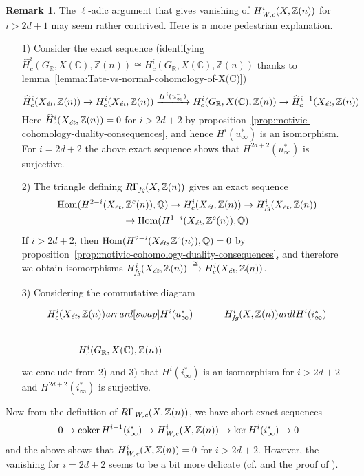\documentclass[draft,leqno,12pt]{article}
\theoremstyle{plain}
\theoremstyle{definition}
\newtheorem{remark}[theorem]{\indent\sc Remark}
\DeclareMathOperator{\Hom}{Hom}
\DeclareMathOperator{\coker}{coker}
\newcommand{\ZZ}{\mathbb{Z}}
\newcommand{\QQ}{\mathbb{Q}}
\newcommand{\RR}{\mathbb{R}}
\newcommand{\CC}{\mathbb{C}}
\newcommand{\Wc}{\text{\it W,c}}
\newcommand{\et}{\text{\it \'{e}t}}
\newcommand{\fg}{\text{\it fg}}
\newcommand{\ar}{\text{\it ar}}
\begin{document}
\begin{remark}
  The $\ell$-adic argument that gives vanishing of $H^i_\Wc (X, \ZZ(n))$ for
  $i > 2d+1$ may seem rather contrived. Here is a more pedestrian explanation.

  \begin{enumerate}
  \item[1)] Consider the exact sequence
    (identifying
    $\widehat{H}^i_c (G_\RR, X (\CC), \ZZ (n)) \cong H^i_c (G_\RR, X (\CC), \ZZ (n))$
    thanks to lemma~\ref{lemma:Tate-vs-normal-cohomology-of-X(C)})
    \[ \widehat{H}^i_c (X_\et, \ZZ(n)) \to H^i_c (X_\et, \ZZ(n))
      \xrightarrow{H^i (u_\infty^*)} H^i_c (G_\RR, X (\CC), \ZZ (n)) \to
      \widehat{H}^{i+1}_c (X_\et, \ZZ(n)) \]
    Here $\widehat{H}^i_c (X_\et, \ZZ(n)) = 0$ for $i > 2d+2$
    by proposition~\ref{prop:motivic-cohomology-duality-consequences},
    and hence $H^i (u_\infty^*)$ is an isomorphism.
    For $i = 2d+2$ the above exact sequence shows that $H^{2d+2} (u_\infty^*)$
    is surjective.

  \item[2)] The triangle defining $R\Gamma_\fg (X, \ZZ(n))$ gives an exact sequence
    \begin{multline*}
      \Hom (H^{2-i} (X_\et, \ZZ^c (n)), \QQ) \to
      H^i_c (X_\et, \ZZ(n)) \to
      H^i_\fg (X_\et, \ZZ(n)) \\
      \to \Hom (H^{1-i} (X_\et, \ZZ^c (n)), \QQ)
    \end{multline*}
    If $i > 2d + 2$, then $\Hom (H^{2-i} (X_\et, \ZZ^c (n)), \QQ) = 0$ by
    proposition~\ref{prop:motivic-cohomology-duality-consequences}, and
    therefore we obtain isomorphisms
    $H^i_\fg (X_\et, \ZZ(n)) \xrightarrow{\cong} H^i_c (X_\et, \ZZ(n))$.

  \item[3)] Considering the commutative diagram
    \[ \begin{tikzcd}
        H^i_c (X_\et, \ZZ(n)) \ar{r}\ar{d}[swap]{H^i (u_\infty^*)} & H^i_\fg (X, \ZZ(n))\ar{dl}{H^i (i_\infty^*)} \\
        H^i_c (G_\RR, X (\CC), \ZZ (n))
      \end{tikzcd} \]
    we conclude from 2) and 3) that $H^i (i_\infty^*)$ is an isomorphism for
    $i > 2d+2$ and $H^{2d+2} (i_\infty^*)$ is surjective.
  \end{enumerate}

  Now from the definition of $R\Gamma_\Wc (X, \ZZ(n))$, we have short exact
  sequences
  \[ 0 \to \coker H^{i-1} (i_\infty^*) \to
    H^i_\Wc (X, \ZZ(n)) \to
    \ker H^i (i_\infty^*) \to 0 \]
  and the above shows that $H^i_\Wc (X, \ZZ(n)) = 0$ for $i > 2d+2$.
  However, the vanishing for $i = 2d+2$ seems to be a bit more delicate
  (cf. \cite[p.\,991]{Kahn-2003-equivalences} and the proof of
  \cite[Theorem~7.3]{Geisser-2004}).
\end{remark}
\end{document}
